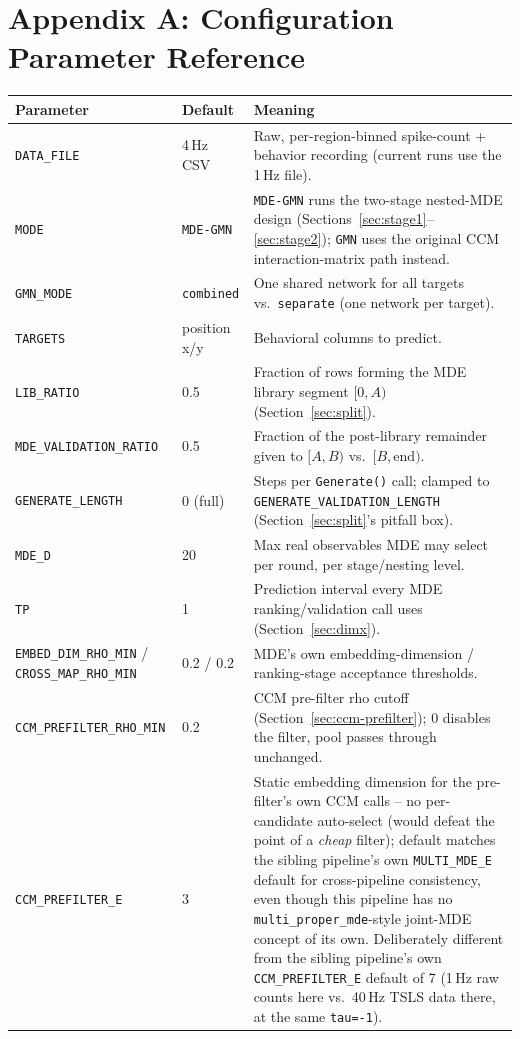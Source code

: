 \documentclass[11pt]{article}
\begin{document}
\section*{Appendix A: Configuration Parameter Reference}
\begin{longtable}{@{}>{\raggedright\arraybackslash}p{4.0cm}>{\raggedright\arraybackslash\small}p{2.6cm}>{\raggedright\arraybackslash}p{7.9cm}@{}}
\toprule
\textbf{Parameter} & \textbf{Default} & \textbf{Meaning} \\
\midrule
\endhead
\texttt{DATA_FILE} & 4\,Hz CSV & Raw, per-region-binned spike-count + behavior recording (current runs use the 1\,Hz file). \\
\texttt{MODE} & \texttt{MDE-GMN} & \texttt{MDE-GMN} runs the two-stage nested-MDE design (Sections~\ref{sec:stage1}--\ref{sec:stage2}); \texttt{GMN} uses the original CCM interaction-matrix path instead. \\
\texttt{GMN_MODE} & \texttt{combined} & One shared network for all targets vs.\ \texttt{separate} (one network per target). \\
\texttt{TARGETS} & position x/y & Behavioral columns to predict. \\
\texttt{LIB_RATIO} & 0.5 & Fraction of rows forming the MDE library segment $[0,A)$ (Section~\ref{sec:split}). \\
\texttt{MDE_VALIDATION_RATIO} & 0.5 & Fraction of the post-library remainder given to $[A,B)$ vs.\ $[B,\mathrm{end})$. \\
\texttt{GENERATE_LENGTH} & 0 (full) & Steps per \texttt{Generate()} call; clamped to \texttt{GENERATE\_VALIDATION\_LENGTH} (Section~\ref{sec:split}'s pitfall box). \\
\texttt{MDE_D} & 20 & Max real observables MDE may select per round, per stage/nesting level. \\
\texttt{TP} & 1 & Prediction interval every MDE ranking/validation call uses (Section~\ref{sec:dimx}). \\
\texttt{EMBED_DIM_RHO_MIN} / \texttt{CROSS_MAP_RHO_MIN} & 0.2 / 0.2 & MDE's own embedding-dimension / ranking-stage acceptance thresholds. \\
\texttt{CCM_PREFILTER_RHO_MIN} & 0.2 & CCM pre-filter rho cutoff (Section~\ref{sec:ccm-prefilter}); 0 disables the filter, pool passes through unchanged. \\
\texttt{CCM_PREFILTER_E} & 3 & Static embedding dimension for the pre-filter's own CCM calls -- no per-candidate auto-select (would defeat the point of a \emph{cheap} filter); default matches the sibling pipeline's own \texttt{MULTI\_MDE\_E} default for cross-pipeline consistency, even though this pipeline has no \texttt{multi\_proper\_mde}-style joint-MDE concept of its own. Deliberately different from the sibling pipeline's own \texttt{CCM\_PREFILTER\_E} default of 7 (1\,Hz raw counts here vs.\ 40\,Hz TSLS data there, at the same \texttt{tau=-1}). \\

\end{longtable}
\end{document}
